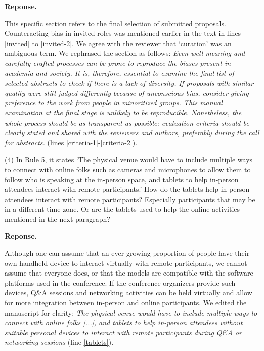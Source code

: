 \documentclass{article}
\newenvironment{Reply}{\noindent\color{BlueViolet}\textbf{Reponse.}}{\vspace{1em}}
\begin{document}
\begin{Reply}

This specific section refers to the final selection of submitted proposals. Counteracting bias in invited roles was mentioned earlier in the text in lines \ref{invited} to \ref{invited-2}.
We agree with the reviewer that `curation' was an ambiguous term.
We rephrased the section as follows: \textit{
Even well-meaning and carefully crafted processes can be prone to reproduce the biases present in academia and society. It is, therefore, essential to examine the final list of selected abstracts to check if there is a lack of diversity. If proposals with similar quality were still judged differently because of unconscious bias, consider giving preference to the work from people in minoritized groups.
This manual examination at the final stage is unlikely to be reproducible. Nonetheless, the whole process should be as transparent as possible: evaluation criteria should be clearly stated and shared with the reviewers and authors, preferably during the call for abstracts.} (lines \ref{criteria-1}-\ref{criteria-2}).

\end{Reply}

(4) In Rule 5, it states `The physical venue would have to include multiple ways to connect with online folks such as cameras and microphones to allow them to follow who is speaking at the in-person space, and tablets to help in-person attendees interact with remote participants.' How do the tablets help in-person attendees interact with remote participants? Especially participants that may be in a different time-zone. Or are the tablets used to help the online activities mentioned in the next paragraph?

\begin{Reply}

Although one can assume that an ever growing proportion of people have their own handheld device to interact virtually with remote participants, we cannot assume that everyone does, or that the models are compatible with the software platforms used in the conference. 
If the conference organizers provide such devices, Q\&A sessions and networking activities can be held virtually and allow for more integration between in-person and online participants. We edited the manuscript for clarity: \textit{The physical venue would have to include multiple ways to connect with online folks [...], and tablets to help in-person attendees without suitable personal devices to interact with remote participants during Q\&A or networking sessions} (line \ref{tablets}).

\end{Reply}
\end{document}
